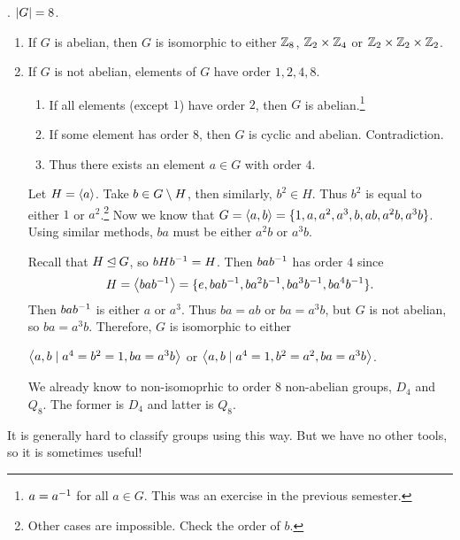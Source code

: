 \ex. \(\left| G \right| = 8\).
\begin{enumerate}
    \item If \(G\) is abelian, then \(G\) is isomorphic to either \(\mathbb{Z}_8\), \(\mathbb{Z}_2 \times \mathbb{Z}_4\) or \(\mathbb{Z}_2 \times \mathbb{Z}_2 \times \mathbb{Z}_2\).
    \item If \(G\) is not abelian, elements of \(G\) have order \(1, 2, 4, 8\).
          \begin{enumerate}
              \item If all elements (except \(1\)) have order \(2\), then \(G\) is abelian.\footnote{\(a = a^{-1}\) for all \(a \in G\). This was an exercise in the previous semester.}
              \item If some element has order \(8\), then \(G\) is cyclic and abelian. Contradiction.
              \item Thus there exists an element \(a \in G\) with order \(4\).
          \end{enumerate}
          Let \(H = \left\langle a \right\rangle\). Take \(b \in G \setminus H\), then similarly, \(b^2 \in H\). Thus \(b^2 \) is equal to either \(1\) or \(a^2\).\footnote{Other cases are impossible. Check the order of \(b\).} Now we know that \(G = \left\langle a, b \right\rangle = \{1, a, a^2, a^3, b, ab, a^2b, a^3b\}\). Using similar methods, \(ba\) must be either \(a^2b\) or \(a^3b\).

          Recall that \(H \unlhd G\), so \(bHb^{-1} = H\). Then \(bab^{-1}\) has order \(4\) since
          \[
              H = \left\langle bab^{-1} \right\rangle = \{e, bab^{-1}, ba^2b^{-1}, ba^3b^{-1}, ba^4b^{-1}\}.
          \]
          Then \(bab^{-1}\) is either \(a\) or \(a^3\). Thus \(ba = ab\) or \(ba = a^3b\), but \(G\) is not abelian, so \(ba = a^3b\). Therefore, \(G\) is isomorphic to either
          \begin{center}
              \(\left\langle a, b \mid a^4 = b^2 = 1, ba = a^3b \right\rangle\) \quad or \quad \(\left\langle a, b \mid a^4 = 1, b^2 = a^2, ba = a^3b \right\rangle\).
          \end{center}
          We already know to non-isomoprhic to order \(8\) non-abelian groups, \(D_4\) and \(Q_8\). The former is \(D_4\) and latter is \(Q_8\).
\end{enumerate}

It is generally hard to classify groups using this way. But we have no other tools, so it is sometimes useful!

\pagebreak